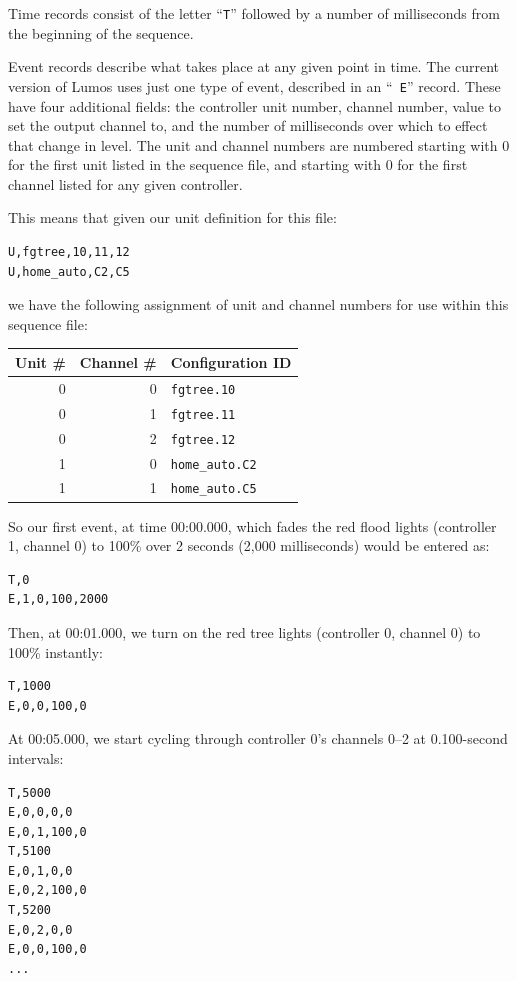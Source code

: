 \documentclass{article}
\begin{document}
Time records consist of the letter ``{\tt T}'' followed by a number
of milliseconds from the beginning of the sequence.  

Event records describe what takes place at any given point in time.  The
current version of Lumos uses just one type of event, described in an ``{\tt
E}'' record.  These have four additional fields: the controller unit number,
channel number, value to set the output channel to, and the number of
milliseconds over which to effect that change in level.  The unit and channel
numbers are numbered starting with 0 for the first unit listed in the sequence
file, and starting with 0 for the first channel listed for any given
controller.

This means that given our unit definition for this file:
\begin{verbatim}
U,fgtree,10,11,12
U,home_auto,C2,C5
\end{verbatim}
we have the following assignment of unit and channel numbers for use within
this sequence file:
\begin{center}
\begin{tabular}{|r|r|l|}\hline
\bf Unit \# & \bf Channel \# & \bf Configuration ID \\ \hline\hline
0 & 0 & \tt fgtree.10 \\ \hline
0 & 1 & \tt fgtree.11 \\ \hline
0 & 2 & \tt fgtree.12 \\ \hline
1 & 0 & \tt home\_auto.C2 \\ \hline
1 & 1 & \tt home\_auto.C5 \\ \hline
\end{tabular}
\end{center}

So our first event, at time 00:00.000, which fades the red flood lights
(controller 1, channel 0) to 100\% over 2 seconds (2,000 milliseconds)
would be entered as:
\begin{verbatim}
T,0
E,1,0,100,2000
\end{verbatim}
Then, at 00:01.000, we turn on the red tree lights (controller 0, channel 0)
to 100\% instantly:
\begin{verbatim}
T,1000
E,0,0,100,0
\end{verbatim}
At 00:05.000, we start cycling through controller 0's channels 0--2 at
0.100-second intervals:
\begin{verbatim}
T,5000
E,0,0,0,0
E,0,1,100,0
T,5100
E,0,1,0,0
E,0,2,100,0
T,5200
E,0,2,0,0
E,0,0,100,0
...
\end{verbatim}
\end{document}
